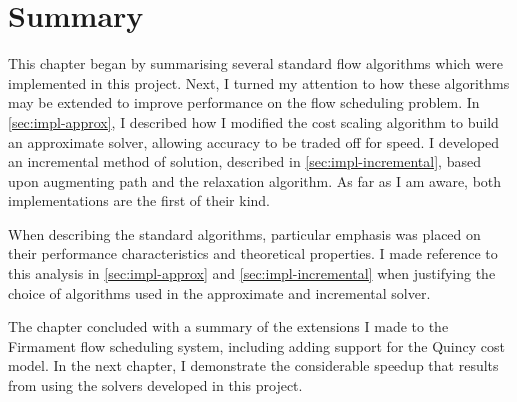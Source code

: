 \section{Summary}

This chapter began by summarising several standard flow algorithms which were implemented in this project. Next, I turned my attention to how these algorithms may be extended to improve performance on the flow scheduling problem. In \cref{sec:impl-approx}, I described how I modified the cost scaling algorithm to build an approximate solver, allowing accuracy to be traded off for speed. I developed an incremental method of solution, described in \cref{sec:impl-incremental}, based upon augmenting path and the relaxation algorithm. As far as I am aware, both implementations are the first of their kind.

When describing the standard algorithms, particular emphasis was placed on their performance characteristics and theoretical properties. I made reference to this analysis in \cref{sec:impl-approx} and \cref{sec:impl-incremental} when justifying the choice of algorithms used in the approximate and incremental solver.

The chapter concluded with a summary of the extensions I made to the Firmament flow scheduling system, including adding support for the Quincy cost model. In the next chapter, I demonstrate the considerable speedup that results from using the solvers developed in this project.